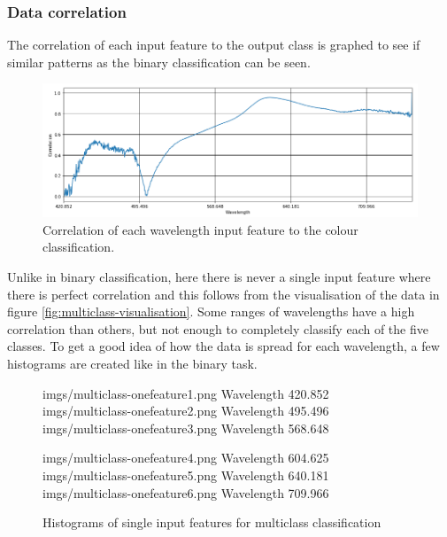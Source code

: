 \documentclass{article}
\begin{document}
\subsubsection{Data correlation}
The correlation of each input feature to the output class is graphed to see if similar patterns as the binary classification can be seen.
\begin{figure}[H]
\centering
\includegraphics[width=1\textwidth, keepaspectratio]{imgs/multiclass-correlation.png}
\caption{Correlation of each wavelength input feature to the colour classification.}
\end{figure}
\noindent
Unlike in binary classification, here there is never a single input feature where there is perfect correlation and this follows from the visualisation of the data in figure \ref{fig:multiclass-visualisation}. Some ranges of wavelengths have a high correlation than others, but not enough to completely classify each of the five classes. To get a good idea of how the data is spread for each wavelength, a few histograms are created like in the binary task.
\begin{figure}[H]
\centering
{}
{imgs/multiclass-onefeature1.png}
{Wavelength 420.852}
\hspace*{\fill}
{imgs/multiclass-onefeature2.png}
{Wavelength 495.496}
\hspace*{\fill}
{imgs/multiclass-onefeature3.png}
{Wavelength 568.648}

\vspace{0.5cm}

{imgs/multiclass-onefeature4.png}
{Wavelength 604.625}
\hspace*{\fill}
{imgs/multiclass-onefeature5.png}
{Wavelength 640.181}
\hspace*{\fill}
{imgs/multiclass-onefeature6.png}
{Wavelength 709.966}
\caption{Histograms of single input features for multiclass classification}
\end{figure}
\end{document}
